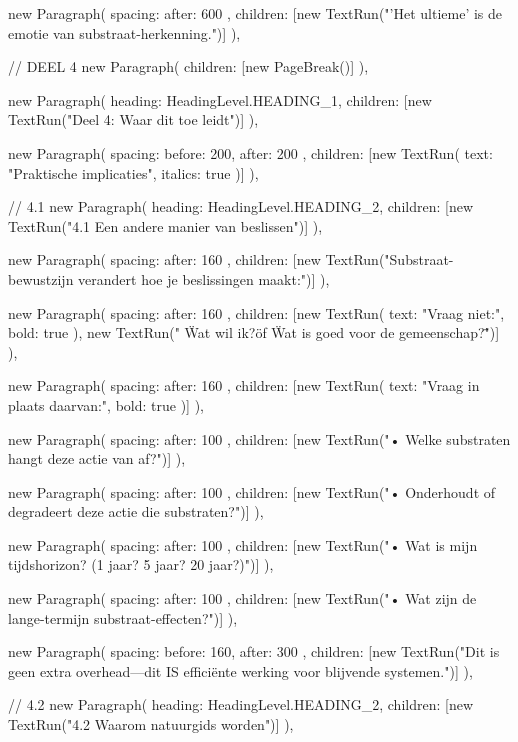 {{      new Paragraph({
        spacing: { after: 600 },
        children: [new TextRun("'Het ultieme' is de emotie van substraat-herkenning.")]
      }),

      // DEEL 4
      new Paragraph({ children: [new PageBreak()] }),

      new Paragraph({
        heading: HeadingLevel.HEADING_1,
        children: [new TextRun("Deel 4: Waar dit toe leidt")]
      }),

      new Paragraph({
        spacing: { before: 200, after: 200 },
        children: [new TextRun({ text: "Praktische implicaties", italics: true })]
      }),

      // 4.1
      new Paragraph({
        heading: HeadingLevel.HEADING_2,
        children: [new TextRun("4.1 Een andere manier van beslissen")]
      }),

      new Paragraph({
        spacing: { after: 160 },
        children: [new TextRun("Substraat-bewustzijn verandert hoe je beslissingen maakt:")]
      }),

      new Paragraph({
        spacing: { after: 160 },
        children: [new TextRun({ text: "Vraag niet:", bold: true }), new TextRun(" \"Wat wil ik?\" of \"Wat is goed voor de gemeenschap?\"")]
      }),

      new Paragraph({
        spacing: { after: 160 },
        children: [new TextRun({ text: "Vraag in plaats daarvan:", bold: true })]
      }),

      new Paragraph({
        spacing: { after: 100 },
        children: [new TextRun("• Welke substraten hangt deze actie van af?")]
      }),

      new Paragraph({
        spacing: { after: 100 },
        children: [new TextRun("• Onderhoudt of degradeert deze actie die substraten?")]
      }),

      new Paragraph({
        spacing: { after: 100 },
        children: [new TextRun("• Wat is mijn tijdshorizon? (1 jaar? 5 jaar? 20 jaar?)")]
      }),

      new Paragraph({
        spacing: { after: 100 },
        children: [new TextRun("• Wat zijn de lange-termijn substraat-effecten?")]
      }),

      new Paragraph({
        spacing: { before: 160, after: 300 },
        children: [new TextRun("Dit is geen extra overhead—dit IS efficiënte werking voor blijvende systemen.")]
      }),

      // 4.2
      new Paragraph({
        heading: HeadingLevel.HEADING_2,
        children: [new TextRun("4.2 Waarom natuurgids worden")]
      }),

}}
